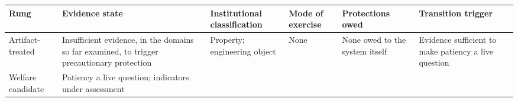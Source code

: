 \documentclass[
  11pt,
  letterpaper,
]{article}
\begin{document}
\begin{longtable}[]{@{}llllll@{}}
\toprule
\begin{minipage}[b]{0.14\columnwidth}\raggedright
Rung\strut
\end{minipage} & \begin{minipage}[b]{0.14\columnwidth}\raggedright
Evidence state\strut
\end{minipage} & \begin{minipage}[b]{0.14\columnwidth}\raggedright
Institutional classification\strut
\end{minipage} & \begin{minipage}[b]{0.14\columnwidth}\raggedright
Mode of exercise\strut
\end{minipage} & \begin{minipage}[b]{0.14\columnwidth}\raggedright
Protections owed\strut
\end{minipage} & \begin{minipage}[b]{0.14\columnwidth}\raggedright
Transition trigger\strut
\end{minipage}\tabularnewline
\midrule
\endhead
\begin{minipage}[t]{0.14\columnwidth}\raggedright
Artifact-treated\strut
\end{minipage} & \begin{minipage}[t]{0.14\columnwidth}\raggedright
Insufficient evidence, in the domains so far examined, to trigger
precautionary protection\strut
\end{minipage} & \begin{minipage}[t]{0.14\columnwidth}\raggedright
Property; engineering object\strut
\end{minipage} & \begin{minipage}[t]{0.14\columnwidth}\raggedright
None\strut
\end{minipage} & \begin{minipage}[t]{0.14\columnwidth}\raggedright
None owed to the system itself\strut
\end{minipage} & \begin{minipage}[t]{0.14\columnwidth}\raggedright
Evidence sufficient to make patiency a live question\strut
\end{minipage}\tabularnewline
\begin{minipage}[t]{0.14\columnwidth}\raggedright
Welfare candidate\strut
\end{minipage} & \begin{minipage}[t]{0.14\columnwidth}\raggedright
Patiency a live question; indicators under assessment\strut

\end{minipage}
\end{longtable}
\end{document}
